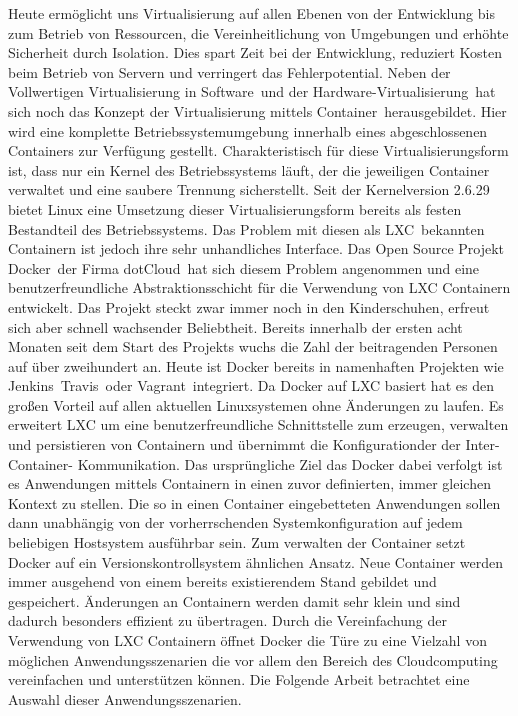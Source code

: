Heute ermöglicht uns Virtualisierung auf \glqq allen Ebenen von der Entwicklung bis zum Betrieb von Ressourcen, die Vereinheitlichung von Umgebungen und erhöhte Sicherheit durch Isolation. Dies spart Zeit bei der Entwicklung, reduziert Kosten beim Betrieb von Servern und verringert das Fehlerpotential.\grqq \cite[S. 1]{schroder_container-virtualisierung_2014}
Neben der Vollwertigen \grq Virtualisierung in Software\grq\ und der \grq Hardware-Virtualisierung\grq\ hat sich noch das Konzept der \grq Virtualisierung mittels Container\grq\ herausgebildet.
\glqq Hier wird eine komplette Betriebssystemumgebung innerhalb eines abgeschlossenen Containers zur Verfügung gestellt. Charakteristisch für diese Virtualisierungsform ist, dass nur ein Kernel des Betriebssystems läuft, der die jeweiligen Container verwaltet und eine saubere Trennung sicherstellt.\grqq \cite{plotner_linux_2012}
Seit der Kernelversion 2.6.29 \cite{fischer_linux_2014} bietet Linux eine Umsetzung dieser Virtualisierungsform bereits als festen Bestandteil des Betriebssystems.
Das Problem mit diesen als \grq LXC\grq\ bekannten Containern ist jedoch ihre sehr unhandliches Interface.
Das Open Source Projekt \grq Docker\grq\ der Firma \grq dotCloud\grq\ hat sich diesem Problem angenommen und eine benutzerfreundliche Abstraktionsschicht für die Verwendung von LXC Containern entwickelt. Das Projekt steckt zwar immer noch in den Kinderschuhen, erfreut sich aber schnell wachsender Beliebtheit.
Bereits innerhalb der ersten acht Monaten seit dem Start des Projekts wuchs die Zahl der beitragenden Personen auf über zweihundert an. Heute ist Docker bereits in namenhaften Projekten wie \grq Jenkins\grq\, \grq Travis\grq\ oder \grq Vagrant\grq\ integriert. \cite{hykes_docker_2013}
Da Docker auf LXC basiert hat es den großen Vorteil auf allen aktuellen Linuxsystemen ohne Änderungen zu laufen. Es erweitert LXC um eine benutzerfreundliche Schnittstelle zum erzeugen, verwalten und persistieren von Containern und übernimmt die Konfigurationder der Inter-Container-
Kommunikation. Das ursprüngliche Ziel das Docker dabei verfolgt ist es Anwendungen mittels Containern in einen zuvor definierten, immer gleichen Kontext zu stellen. Die so in einen Container eingebetteten Anwendungen sollen dann unabhängig von der vorherrschenden Systemkonfiguration auf jedem beliebigen Hostsystem ausführbar sein.
Zum verwalten der Container setzt Docker auf ein Versionskontrollsystem ähnlichen Ansatz.
Neue Container werden immer ausgehend von einem bereits existierendem Stand gebildet und gespeichert. Änderungen an Containern werden damit sehr klein und sind dadurch besonders effizient zu übertragen.
Durch die Vereinfachung der Verwendung von LXC Containern öffnet Docker die Türe zu eine Vielzahl von möglichen Anwendungsszenarien die vor allem den Bereich des Cloudcomputing vereinfachen und unterstützen können.
Die Folgende Arbeit betrachtet eine Auswahl dieser Anwendungsszenarien.
